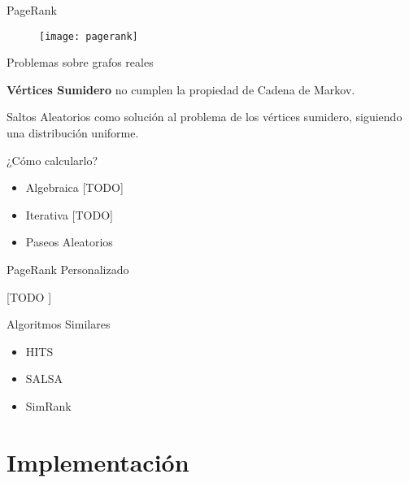 \documentclass[12pt]{beamer}
\begin{document}
    \begin{frame}[fragile]{PageRank}

      \begin{figure}
        \texttt{[image: pagerank]}
        \caption{}
        \label{}
      \end{figure}

    \end{frame}

    \begin{frame}[fragile]{Problemas sobre grafos reales}

      \textbf{Vértices Sumidero} no cumplen la propiedad de Cadena de Markov.

      Saltos Aleatorios como solución al problema de los vértices sumidero, siguiendo una distribución uniforme.

    \end{frame}

    \begin{frame}[fragile]{¿Cómo calcularlo?}

      \begin{itemize}
        \item Algebraica [TODO]
        \item Iterativa [TODO]
        \item Paseos Aleatorios
      \end{itemize}

    \end{frame}

    \begin{frame}[fragile]{PageRank Personalizado}

      [TODO ]

    \end{frame}

    \begin{frame}[fragile]{Algoritmos Similares}

      \begin{itemize}
        \item HITS
        \item SALSA
        \item SimRank
      \end{itemize}

    \end{frame}

  \section{Implementación}
\end{document}
